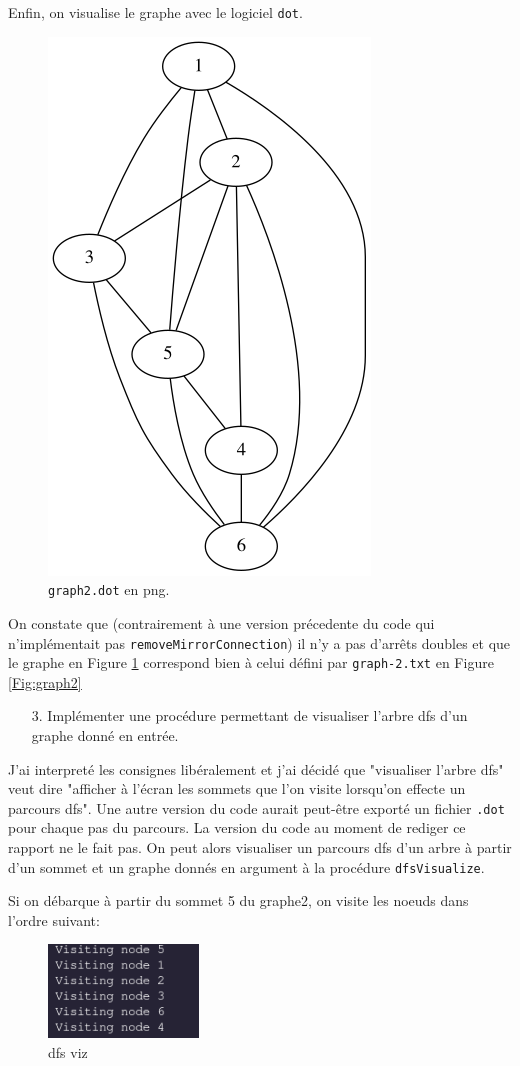 \documentclass[10pt]{article} %
\begin{document}
Enfin, on visualise le graphe avec le logiciel \texttt{dot}.

\begin{figure}[h!]
    \centering
    \includegraphics[width=.2\textwidth]{media/graph2.png}
    \caption{\texttt{graph2.dot} en png.}
    \label{Fig:myfig}

\end{figure}

On constate que (contrairement à une version précedente du code qui n'implémentait pas \texttt{removeMirrorConnection}) il n'y a pas d'arrêts
doubles et que le graphe en Figure \ref{Fig:myfig} correspond bien à celui défini par \texttt{graph-2.txt} en Figure \ref{Fig:graph2}


\begin{itemize}
    \item [3.] Implémenter une procédure permettant de visualiser l'arbre dfs d'un graphe donné en entrée.
\end{itemize}

J'ai interpreté les consignes libéralement et j'ai décidé que "visualiser l'arbre dfs" veut dire "afficher à l'écran les sommets que l'on visite
lorsqu'on effecte un parcours dfs". Une autre version du code aurait peut-être exporté un fichier \texttt{.dot} pour chaque pas du parcours. La version du code au moment de rediger ce
rapport ne le fait pas. On peut alors visualiser
un parcours dfs d'un arbre à partir d'un sommet et un graphe donnés en argument à la procédure \texttt{dfsVisualize}.

Si on débarque à partir du sommet 5 du graphe2, on visite les noeuds dans l'ordre suivant:

\begin{figure}[h!]
    \centering
    \includegraphics[width=4cm]{media/dfs_vis.png}
    \caption{dfs viz}
    \label{Fig:viz}
\end{figure}
\end{document}
